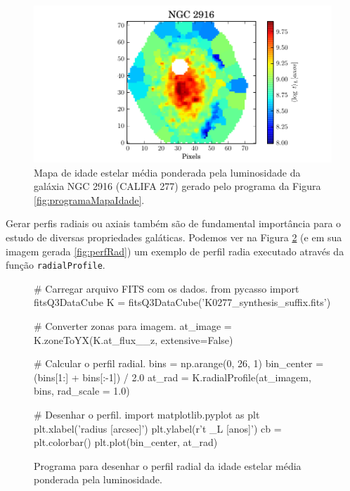 \begin{figure}
	\includegraphics{figuras/at_flux_zone.pdf}
	\caption[Mapa da idade estelar média da galáxia NGC 2916] 
	{Mapa de idade estelar média ponderada pela luminosidade da galáxia NGC 2916
	(CALIFA 277) gerado pelo programa da Figura \ref{fig:programaMapaIdade}.}
	\label{fig:mapaIdade}
\end{figure}

Gerar perfis radiais ou axiais também são de fundamental importância para o
estudo de diversas propriedades galáticas. Podemos ver na Figura
\ref{fig:programaPerfRad} (e em sua imagem gerada \ref{fig:perfRad}) um exemplo
de perfil radia executado através da função \texttt{radialProfile}.

\begin{figure}
\begin{python}
# Carregar arquivo FITS com os dados.
from pycasso import fitsQ3DataCube
K = fitsQ3DataCube('K0277_synthesis_suffix.fits')

# Converter zonas para imagem.
at_image = K.zoneToYX(K.at_flux__z, extensive=False)

# Calcular o perfil radial.
bins = np.arange(0, 26, 1)
bin_center = (bins[1:] + bins[:-1]) / 2.0
at_rad = K.radialProfile(at_imagem, bins, rad_scale = 1.0)

# Desenhar o perfil.
import matplotlib.pyplot as plt
plt.xlabel('radius [arcsec]')
plt.ylabel(r'\langle \log t \langle_L [anos]')
cb = plt.colorbar()
plt.plot(bin_center, at_rad)

\end{python}
	\caption[Exemplo de programa para perfil radial]
	{Programa para desenhar o perfil radial da idade estelar média ponderada pela
	luminosidade.}
	\label{fig:programaPerfRad}
\end{figure}


